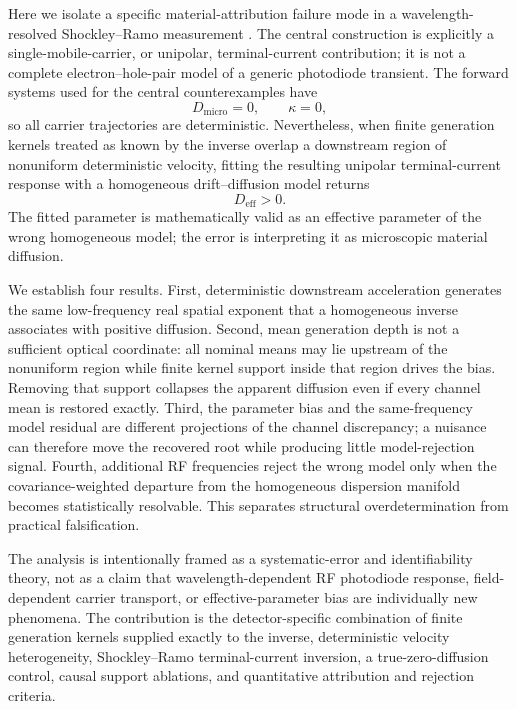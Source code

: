 \documentclass[aps,pra,twocolumn,superscriptaddress,nofootinbib]{revtex4-2}
\newcommand{\Deff}{D_{\mathrm{eff}}}
\newcommand{\Dmicro}{D_{\mathrm{micro}}}
\begin{document}
Here we isolate a specific material-attribution failure mode in a wavelength-resolved Shockley--Ramo measurement \cite{shockley1938,ramo1939}. The central construction is explicitly a single-mobile-carrier, or unipolar, terminal-current contribution; it is not a complete electron--hole-pair model of a generic photodiode transient. The forward systems used for the central counterexamples have
\begin{equation}
\Dmicro=0,
\qquad
\kappa=0,
\end{equation}
so all carrier trajectories are deterministic. Nevertheless, when finite generation kernels treated as known by the inverse overlap a downstream region of nonuniform deterministic velocity, fitting the resulting unipolar terminal-current response with a homogeneous drift--diffusion model returns
\begin{equation}
\Deff>0.
\end{equation}
The fitted parameter is mathematically valid as an effective parameter of the wrong homogeneous model; the error is interpreting it as microscopic material diffusion.

We establish four results. First, deterministic downstream acceleration generates the same low-frequency real spatial exponent that a homogeneous inverse associates with positive diffusion. Second, mean generation depth is not a sufficient optical coordinate: all nominal means may lie upstream of the nonuniform region while finite kernel support inside that region drives the bias. Removing that support collapses the apparent diffusion even if every channel mean is restored exactly. Third, the parameter bias and the same-frequency model residual are different projections of the channel discrepancy; a nuisance can therefore move the recovered root while producing little model-rejection signal. Fourth, additional RF frequencies reject the wrong model only when the covariance-weighted departure from the homogeneous dispersion manifold becomes statistically resolvable. This separates structural overdetermination from practical falsification.

The analysis is intentionally framed as a systematic-error and identifiability theory, not as a claim that wavelength-dependent RF photodiode response, field-dependent carrier transport, or effective-parameter bias are individually new phenomena. The contribution is the detector-specific combination of finite generation kernels supplied exactly to the inverse, deterministic velocity heterogeneity, Shockley--Ramo terminal-current inversion, a true-zero-diffusion control, causal support ablations, and quantitative attribution and rejection criteria.
\end{document}
